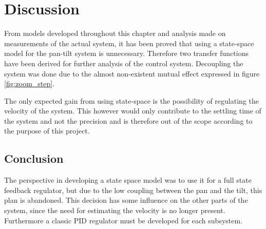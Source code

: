 \section{Discussion}
From models developed throughout this chapter and analysis made on measurements of the actual system, it has been proved that using a state-space model for the pan-tilt system is unnecessary. Therefore two transfer functions have been derived for further analysis of the control system. Decoupling the system was done due to the almost non-existent mutual effect expressed in figure \ref{fig:zoom_step}.

The only expected gain from using state-space is the possibility of regulating the velocity of the system. This however would only contribute to the settling time of the system and not the precision and is therefore out of the scope according to the purpose of this project.

\subsection{Conclusion}
The perspective in developing a state space model was to use it for a full state feedback regulator, but due to the low coupling between the pan and the tilt, this plan is abandoned. This decision has some influence on the other parts of the system, since the need for estimating the velocity is no longer present. Furthermore a classic PID regulator must be developed for each subsystem.
